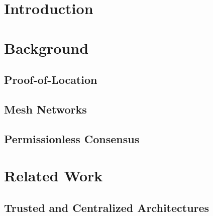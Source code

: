 


\newpage
\section{Introduction} \label{sec:introduction}



\newpage
\section{Background} \label{sec:background}



\subsection{Proof-of-Location} \label{sec:background-proof-of-location}



\subsection{Mesh Networks} \label{sec:background-wireless-mesh-networks}



\subsection{Permissionless Consensus} \label{sec:background-permissionless-consensus}



\newpage
\section{Related Work} \label{sec:related-work}



\subsection{Trusted and Centralized Architectures} \label{sec:related-work-trusted-centralized}

